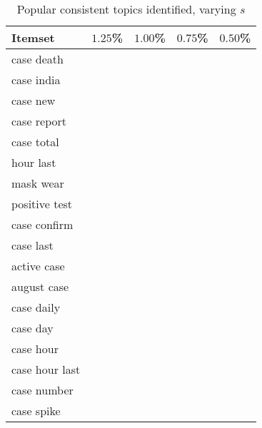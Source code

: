 
\begin{table}
    \centering
    \caption{Popular consistent topics identified, varying $s$}
    \label{tab:s}
    \begin{tabular}{>{\raggedright}p{}>{\raggedright}p{}p{}p{}p{}}
        \toprule
            Itemset
& $1.25$\small\%  & $1.00$\small\%  & $0.75$\small\%  & $0.50$\small\%   \\          
        \midrule
        case death & \checkC{} & \checkC{} & \checkC{} & \checkC{} \\
                case india & \checkC{} & \checkC{} & \checkC{} & \checkC{} \\
                case new & \checkC{} & \checkC{} & \checkC{} & \checkC{} \\
                case report & \checkC{} & \checkC{} & \checkC{} & \checkC{} \\
                case total & \checkC{} & \checkC{} & \checkC{} & \checkC{} \\
                hour last & \checkC{} & \checkC{} & \checkC{} & \checkC{} \\
                mask wear & \checkC{} & \checkC{} & \checkC{} & \checkC{} \\
                positive test & \checkC{} & \checkC{} & \checkC{} & \checkC{} \\
                case confirm &        {} & \checkC{} & \checkC{} & \checkC{} \\
                case last &        {} & \checkC{} & \checkC{} & \checkC{} \\
                active case &        {} &        {} & \checkC{} & \checkC{} \\
                august case &        {} &        {} & \checkC{} & \checkC{} \\
                case daily &        {} &        {} & \checkC{} & \checkC{} \\
                case day &        {} &        {} & \checkC{} & \checkC{} \\
                case hour &        {} &        {} & \checkC{} & \checkC{} \\
                case hour last &        {} &        {} & \checkC{} & \checkC{} \\
                case number &        {} &        {} & \checkC{} & \checkC{} \\
                case spike &        {} &        {} & \checkC{} & \checkC{} \\

\end{tabular}
\end{table}
